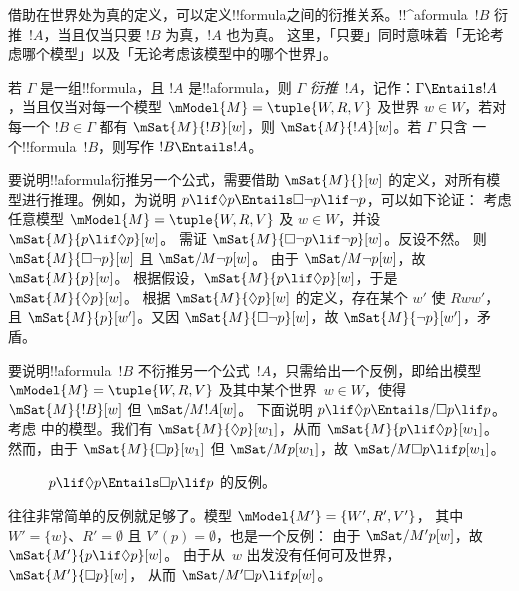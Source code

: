 \documentclass[../../../include/open-logic-section]{subfiles}
\begin{document}


\begin{explain}
  借助在世界处为真的定义，可以定义!!{formula}之间的衍推关系。!!^a{formula}~$!B$ 衍推~$!A$，当且仅当只要 $!B$ 为真，$!A$ 也为真。
  这里，「只要」同时意味着「无论考虑哪个模型」以及「无论考虑该模型中的哪个世界」。
\end{explain}

\begin{defn}
  若 $\Gamma$ 是一组!!{formula}，且 $!A$ 是!!a{formula}，则 $\Gamma$
  \emph{衍推}~$!A$，记作：$\Gamma \Entails !A$，当且仅当对每一个模型
  $\mModel{M} = \tuple{W, R, V}$ 及世界 $w \in W$，若对每一个 $!B \in
  \Gamma$ 都有 $\mSat{M}{!B}[w]$，则 $\mSat{M}{!A}[w]$。若 $\Gamma$ 只含
  一个!!{formula}~$!B$，则写作 $!B \Entails !A$。
\end{defn}

\begin{ex}
  要说明!!a{formula}衍推另一个公式，需要借助 $\mSat{M}{}[w]$
  的定义，对所有模型进行推理。例如，为说明 $p \lif \Diamond p \Entails \Box\lnot p \lif \lnot p$，可以如下论证：
  考虑任意模型 $\mModel{M} = \tuple{W, R, V}$ 及 $w \in W$，并设 $\mSat{M}{p \lif \Diamond p}[w]$。
  需证 $\mSat{M}{\Box\lnot p \lif \lnot p}[w]$。反设不然。
  则 $\mSat{M}{\Box\lnot p}[w]$ 且 $\mSat/{M}{\lnot p}[w]$。
  由于 $\mSat/{M}{\lnot p}[w]$，故 $\mSat{M}{p}[w]$。
  根据假设，$\mSat{M}{p \lif \Diamond p}[w]$，于是 $\mSat{M}{\Diamond p}[w]$。
  根据 $\mSat{M}{\Diamond p}[w]$ 的定义，存在某个 $w'$ 使 $Rww'$，且 $\mSat{M}{p}[w']$。又因
  $\mSat{M}{\Box \lnot p}[w]$，故 $\mSat{M}{\lnot p}[w']$，矛盾。

  要说明!!a{formula}~$!B$ 不衍推另一个公式~$!A$，只需给出一个反例，即给出模型 $\mModel{M} = \tuple{W, R, V}$ 及其中某个世界~$w \in W$，使得 $\mSat{M}{!B}[w]$ 但 $\mSat/{M}{!A}[w]$。
  下面说明 $p \lif \Diamond p \Entails/ \Box p \lif p$。考虑  中的模型。我们有 $\mSat{M}{\Diamond p}[w_1]$，从而 $\mSat{M}{p \lif \Diamond p}[w_1]$。
  然而，由于 $\mSat{M}{\Box p}[w_1]$ 但 $\mSat/{M}{p}[w_1]$，故 $\mSat/{M}{\Box p \lif p}[w_1]$。
  \begin{figure}
  \begin{center}
  \end{center}
  \caption{$p \lif \Diamond p \Entails \Box p \lif p$ 的反例。}
  \end{figure}

  往往非常简单的反例就足够了。模型 $\mModel{M'} = \{W', R', V'\}$，
  其中 $W' = \{w\}$、$R' = \emptyset$ 且 $V'(p) = \emptyset$，也是一个反例：
  由于 $\mSat/{M'}{p}[w]$，故 $\mSat{M'}{p \lif \Diamond p}[w]$。
  由于从~$w$ 出发没有任何可及世界，$\mSat{M'}{\Box p}[w]$，
  从而 $\mSat/{M'}{\Box p \lif p}[w]$。
\end{ex}
\end{document}
